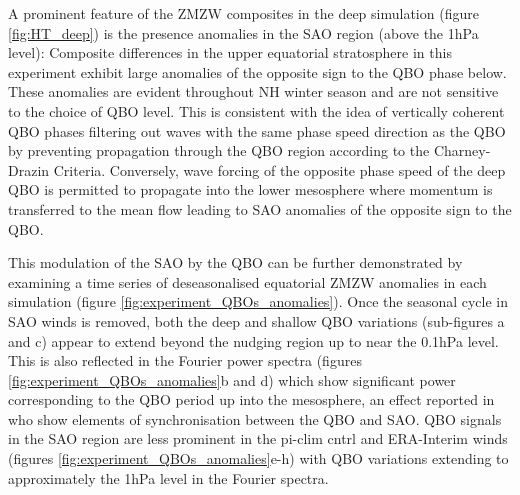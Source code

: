 A prominent feature of the ZMZW composites in the deep simulation (figure \ref{fig:HT_deep}) is the presence anomalies in the SAO region (above the 1hPa level): Composite differences in the upper equatorial stratosphere in this experiment exhibit large anomalies of the opposite sign to the QBO phase below. These anomalies are evident throughout NH winter season and are not sensitive to the choice of QBO level. This is consistent with the idea of vertically coherent QBO phases filtering out waves with the same phase speed direction as the QBO by preventing propagation through the QBO region according to the Charney-Drazin Criteria. Conversely, wave forcing of the opposite phase speed of the deep QBO is permitted to propagate into the lower mesosphere where momentum is transferred to the mean flow leading to SAO anomalies of the opposite sign to the QBO. 

This modulation of the SAO by the QBO can be further demonstrated by examining a time series of deseasonalised equatorial ZMZW anomalies in each simulation (figure \ref{fig:experiment_QBOs_anomalies}). Once the seasonal cycle in SAO winds is removed, both the deep and shallow QBO variations (sub-figures a and c) appear to extend beyond the nudging region up to near the 0.1hPa level. This is also reflected in the Fourier power spectra (figures \ref{fig:experiment_QBOs_anomalies}b and d) which show significant power corresponding to the QBO period up into the mesosphere, an effect reported in \cite{kuaiNonstationary2009c} who show elements of synchronisation between the QBO and SAO. QBO signals in the SAO region are less prominent in the pi-clim cntrl and ERA-Interim winds (figures \ref{fig:experiment_QBOs_anomalies}e-h) with QBO variations extending to approximately the 1hPa level in the Fourier spectra. 

